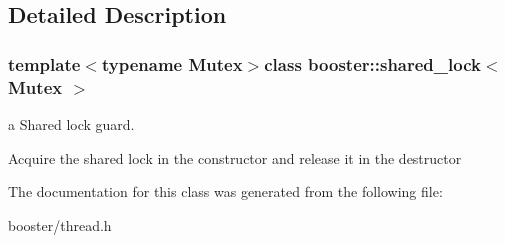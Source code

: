 \subsection{Detailed Description}
\subsubsection*{template$<$typename Mutex$>$class booster\-::shared\-\_\-lock$<$ Mutex $>$}

a Shared lock guard. 

Acquire the shared lock in the constructor and release it in the destructor 

The documentation for this class was generated from the following file\-:\begin{DoxyCompactItemize}
\item 
booster/thread.\-h\end{DoxyCompactItemize}

